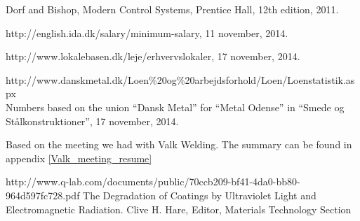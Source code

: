 \begin{thebibliography}{9}
	Dorf and Bishop,
	Modern Control Systems,
	Prentice Hall, 
	12th edition, 
	2011.

	http://english.ida.dk/salary/minimum-salary,
	11 november,
	2014.
	
	http://www.lokalebasen.dk/leje/erhvervslokaler,
	17 november,
	2014.
	
	http://www.danskmetal.dk/Loen\%20og\%20arbejdsforhold/Loen/Loenstatistik.aspx \\
	Numbers based on the union ``Dansk Metal'' for ``Metal Odense'' in ``Smede og Stålkonstruktioner'',
	17 november,
	2014. 
	
	Based on the meeting we had with Valk Welding.
	The summary can be found in appendix \ref{Valk_meeting_resume}
	
	http://www.q-lab.com/documents/public/70ccb209-bf41-4da0-bb80-964d597fc728.pdf
	The Degradation of Coatings by Ultraviolet Light and Electromagnetic Radiation.
	Clive H. Hare, Editor, Materials Technology Section 
	
\end{thebibliography}
